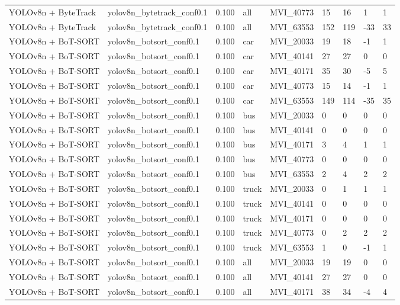 \begin{tabular}{lllllllll}
YOLOv8n + ByteTrack & yolov8n\_bytetrack\_conf0.1 & 0.100 & all & MVI\_40773 & 15 & 16 & 1 & 1 \\
YOLOv8n + ByteTrack & yolov8n\_bytetrack\_conf0.1 & 0.100 & all & MVI\_63553 & 152 & 119 & -33 & 33 \\
YOLOv8n + BoT-SORT & yolov8n\_botsort\_conf0.1 & 0.100 & car & MVI\_20033 & 19 & 18 & -1 & 1 \\
YOLOv8n + BoT-SORT & yolov8n\_botsort\_conf0.1 & 0.100 & car & MVI\_40141 & 27 & 27 & 0 & 0 \\
YOLOv8n + BoT-SORT & yolov8n\_botsort\_conf0.1 & 0.100 & car & MVI\_40171 & 35 & 30 & -5 & 5 \\
YOLOv8n + BoT-SORT & yolov8n\_botsort\_conf0.1 & 0.100 & car & MVI\_40773 & 15 & 14 & -1 & 1 \\
YOLOv8n + BoT-SORT & yolov8n\_botsort\_conf0.1 & 0.100 & car & MVI\_63553 & 149 & 114 & -35 & 35 \\
YOLOv8n + BoT-SORT & yolov8n\_botsort\_conf0.1 & 0.100 & bus & MVI\_20033 & 0 & 0 & 0 & 0 \\
YOLOv8n + BoT-SORT & yolov8n\_botsort\_conf0.1 & 0.100 & bus & MVI\_40141 & 0 & 0 & 0 & 0 \\
YOLOv8n + BoT-SORT & yolov8n\_botsort\_conf0.1 & 0.100 & bus & MVI\_40171 & 3 & 4 & 1 & 1 \\
YOLOv8n + BoT-SORT & yolov8n\_botsort\_conf0.1 & 0.100 & bus & MVI\_40773 & 0 & 0 & 0 & 0 \\
YOLOv8n + BoT-SORT & yolov8n\_botsort\_conf0.1 & 0.100 & bus & MVI\_63553 & 2 & 4 & 2 & 2 \\
YOLOv8n + BoT-SORT & yolov8n\_botsort\_conf0.1 & 0.100 & truck & MVI\_20033 & 0 & 1 & 1 & 1 \\
YOLOv8n + BoT-SORT & yolov8n\_botsort\_conf0.1 & 0.100 & truck & MVI\_40141 & 0 & 0 & 0 & 0 \\
YOLOv8n + BoT-SORT & yolov8n\_botsort\_conf0.1 & 0.100 & truck & MVI\_40171 & 0 & 0 & 0 & 0 \\
YOLOv8n + BoT-SORT & yolov8n\_botsort\_conf0.1 & 0.100 & truck & MVI\_40773 & 0 & 2 & 2 & 2 \\
YOLOv8n + BoT-SORT & yolov8n\_botsort\_conf0.1 & 0.100 & truck & MVI\_63553 & 1 & 0 & -1 & 1 \\
YOLOv8n + BoT-SORT & yolov8n\_botsort\_conf0.1 & 0.100 & all & MVI\_20033 & 19 & 19 & 0 & 0 \\
YOLOv8n + BoT-SORT & yolov8n\_botsort\_conf0.1 & 0.100 & all & MVI\_40141 & 27 & 27 & 0 & 0 \\
YOLOv8n + BoT-SORT & yolov8n\_botsort\_conf0.1 & 0.100 & all & MVI\_40171 & 38 & 34 & -4 & 4 \\

\end{tabular}
